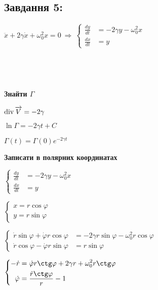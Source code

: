 \subsection{Завдання 5:}

$\ddot{x} + 2\gamma\dot{x}+\omega_0^2x = 0 \ \Longrightarrow \ 
\left\{\begin{aligned}
    \frac{dy}{dt} &= -2\gamma y -\omega_0^2x\\
    \frac{dx}{dt} &= y 
\end{aligned}\right.$

\begin{figure}[ht]
    \begin{minipage}[h]{0.49\linewidth}
         \\
    \end{minipage}
    \begin{minipage}[h]{0.49\linewidth}
         \\
    \end{minipage}
\end{figure}

\textbf{Знайти $\Gamma$}

$\operatorname*{div} \overrightarrow{V} = -2\gamma$

$\ln \Gamma = -2\gamma t + C$

$\Gamma(t) = \Gamma(0)e^{-2\gamma t}$

\textbf{Записати в полярних координатах}

$\left\{\begin{aligned}
    \frac{dy}{dt} &= -2\gamma y -\omega_0^2x\\
    \frac{dx}{dt} &= y 
\end{aligned}\right.$

$\left\{\begin{aligned}
    x = r\cos \varphi \\
    y = r\sin \varphi 
\end{aligned}\right.$

$\left\{\begin{aligned}
    \dot{r}\sin \varphi + \dot{\varphi}r \cos \varphi &=  -2\gamma r\sin \varphi - \omega_0^2 r\cos \varphi\\
    \dot{r}\cos \varphi - \dot{\varphi} r \sin \varphi &= r \sin \varphi
\end{aligned}\right.$

$\left\{\begin{aligned}
    -\dot{r} &= \dot{\varphi}r\ctg \varphi + 2\gamma r + \omega_0^2 r \ctg \varphi \\
    \dot{\varphi} &= \frac{\dot{r}\ctg \varphi }{r} - 1
\end{aligned}\right.$

